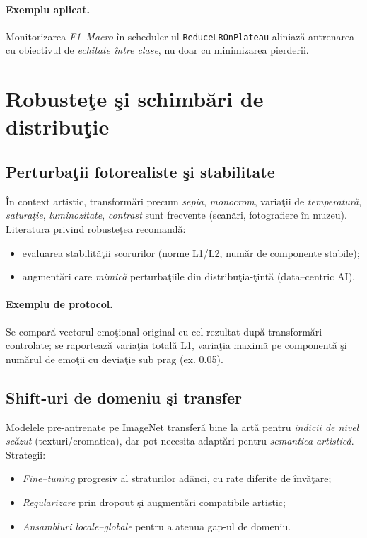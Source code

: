 \paragraph{Exemplu aplicat.} Monitorizarea \emph{F1–Macro} în scheduler-ul \texttt{ReduceLROnPlateau} aliniază antrenarea cu obiectivul de \emph{echitate între clase}, nu doar cu minimizarea pierderii.

\section{Robusteţe şi schimbări de distribuţie}

\subsection{Perturbaţii fotorealiste şi stabilitate}

În context artistic, transformări precum \emph{sepia}, \emph{monocrom}, variaţii de \emph{temperatură}, \emph{saturaţie}, \emph{luminozitate}, \emph{contrast} sunt frecvente (scanări, fotografiere în muzeu). Literatura privind robusteţea recomandă:
\begin{itemize}[leftmargin=*, itemsep=2pt, topsep=2pt]
  \item evaluarea stabilităţii scorurilor (norme L1/L2, număr de componente stabile);
  \item augmentări care \emph{mimică} perturbaţiile din distribuţia-ţintă (data–centric AI).
\end{itemize}

\paragraph{Exemplu de protocol.} Se compară vectorul emoţional original cu cel rezultat după transformări controlate; se raportează variaţia totală L1, variaţia maximă pe componentă şi numărul de emoţii cu deviaţie sub prag (ex. 0.05).

\subsection{Shift-uri de domeniu şi transfer}

Modelele pre-antrenate pe ImageNet transferă bine la artă pentru \emph{indicii de nivel scăzut} (texturi/cromatica), dar pot necesita adaptări pentru \emph{semantica artistică}. Strategii:
\begin{itemize}[leftmargin=*, itemsep=2pt, topsep=2pt]
  \item \emph{Fine–tuning} progresiv al straturilor adânci, cu rate diferite de învăţare;
  \item \emph{Regularizare} prin dropout şi augmentări compatibile artistic;
  \item \emph{Ansambluri locale–globale} pentru a atenua gap-ul de domeniu.
\end{itemize}

